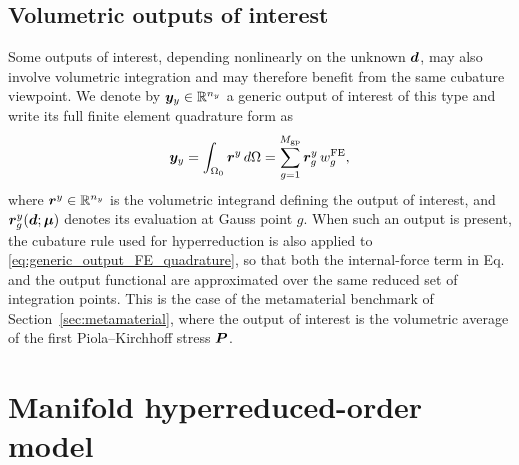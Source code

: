 \documentclass[preprint,10pt]{elsarticle}  %
\newtheorem{remark}{Remark}
\begin{document}
%


\subsection{Volumetric outputs of interest}
\label{sec:FOM_outputs}

 Some outputs of interest,   depending nonlinearly on the unknown
\(\bm{d}\), may also involve volumetric integration and may therefore
benefit from the same cubature viewpoint. We denote by
\(\bm{y}_{{y}}\in\mathbb{R}^{n_{{y}}}\) a generic output of interest of this type
and write its full finite element quadrature form as
\begin{equation}
\label{eq:generic_output_FE_quadrature}
    \bm{y}_{{y}}
    =
    \int_{\Omega_0}
    \bm{r}^{{y}} \,d\Omega
    =
    \sum_{g=1}^{M_{\mathrm{gp}}}
    \bm{r}^{{y}}_{g} \,w^{\mathrm{FE}}_{g},
\end{equation}
where \(\bm{r}^{{y}}\in\mathbb{R}^{n_{{y}}}\) is the volumetric integrand defining
the output of interest, and \(\bm{r}^{{y}}_{g}(\bm{d};\bm{\mu})\) denotes its
evaluation at Gauss point \(g\). When such an output is present, the
cubature rule used for hyperreduction is also applied to
\eqref{eq:generic_output_FE_quadrature}, so that both the internal-force
term in Eq.~ and the output functional
are approximated over the same reduced set of integration points. This is
the case of the metamaterial benchmark of Section~\ref{sec:metamaterial},
where the output of interest is the volumetric average of the first
Piola--Kirchhoff stress \(\boldsymbol{P}\).



\section{Manifold hyperreduced-order model}
\end{document}
